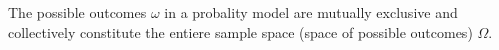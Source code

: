 The possible outcomes $\omega$ in a probality model are mutually exclusive and collectively constitute the entiere sample space (space of possible outcomes) $\Omega$.
